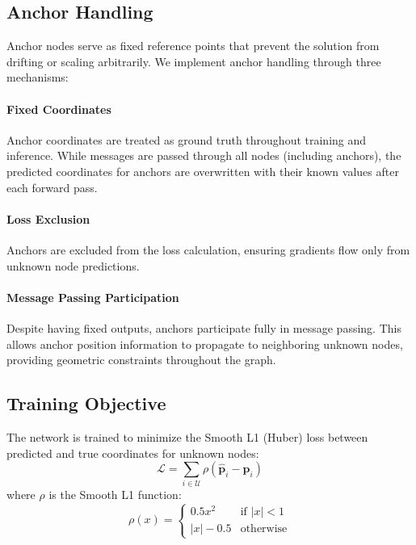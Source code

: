 \documentclass[master,final,11pt]{iscs-thesis}
\begin{document}
\subsection{Anchor Handling}

Anchor nodes serve as fixed reference points that prevent the solution from drifting or scaling arbitrarily.
We implement anchor handling through three mechanisms:

\paragraph{Fixed Coordinates}
Anchor coordinates are treated as ground truth throughout training and inference.
While messages are passed through all nodes (including anchors), the predicted coordinates for anchors are overwritten with their known values after each forward pass.

\paragraph{Loss Exclusion}
Anchors are excluded from the loss calculation, ensuring gradients flow only from unknown node predictions.

\paragraph{Message Passing Participation}
Despite having fixed outputs, anchors participate fully in message passing.
This allows anchor position information to propagate to neighboring unknown nodes, providing geometric constraints throughout the graph.

\subsection{Training Objective}

The network is trained to minimize the Smooth L1 (Huber) loss between predicted and true coordinates for unknown nodes:
\begin{equation}
    \mathcal{L} = \sum_{i \in \mathcal{U}} \rho(\hat{\mathbf{p}}_i - \mathbf{p}_i)
\end{equation}
where $\rho$ is the Smooth L1 function:
\begin{equation}
    \rho(x) = \begin{cases}
        0.5 x^2 & \text{if } |x| < 1 \\
        |x| - 0.5 & \text{otherwise}
    \end{cases}
\end{equation}
\end{document}

